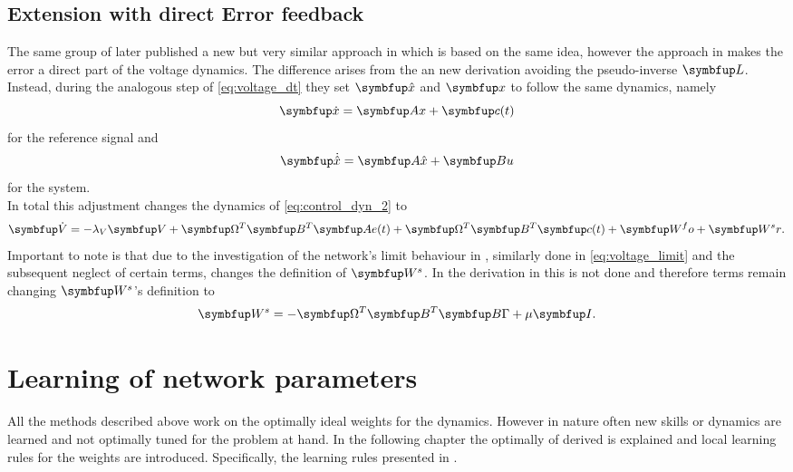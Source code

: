 \subsection{Extension with direct Error feedback}\label{ssec:extension}
The same group of \cite{huang_optimizing_2017} later published a new but very similar approach in \cite{huang_spiking_2019} which is based on the same idea, however the approach in \cite{huang_spiking_2019} makes the error a direct part of the voltage dynamics. The difference arises from the an new derivation avoiding the pseudo-inverse $\bmu{L}$.\\
Instead, during the analogous step of \cref{eq:voltage_dt} they set $\bmu{\hat{x}}$
and $\bmu{x}$ to follow the same dynamics, namely
\begin{equation}\label{eq:feedback_c2}
	\bmu{\dot{x}} = \bmu{Ax} + \bmu{c}(t)
\end{equation}
for the reference signal and
\begin{equation}
	\bmu{\dot{\hat{x}}} = \bmu{A\hat{x}} + \bmu{Bu}
\end{equation}
for the system.\\
In total this adjustment changes the dynamics of \cref{eq:control_dyn_2} to
\begin{equation}\label{eq:direct_error_voltage}
	\bmu{\dot{V}} = -\lambda_V\bmu{V} + \bmu{\Omega}^T \bmu{B}^T\bmu{Ae}(t) + \bmu{\Omega}^T \bmu{B}^T \bmu{c}(t) + \bmu{W^fo} + \bmu{W^sr}.
\end{equation}
Important to note is that due to the investigation of the network's limit behaviour in \cite{huang_optimizing_2017}, similarly done in \cref{eq:voltage_limit} and the subsequent neglect of certain terms, changes the definition of $\bmu{W^s}$. In the derivation in \cite{huang_spiking_2019} this is not done and therefore terms remain changing $\bmu{W^s}$'s definition to
\begin{equation}
	\bmu{W^s} = -\bmu{\Omega}^T\bmu{B}^T\bmu{B\Gamma} + \mu\bmu{I}.
\end{equation}


\section{Learning of network parameters}\label{sec:learning}
All the methods described above work on the optimally ideal weights for the dynamics. However in nature often new skills or dynamics are learned and not optimally tuned for the problem at hand. In the following chapter the optimally of derived is explained and local learning rules for the weights are introduced. Specifically, the learning rules presented in \cite{bourdoukan_learning_2012,brendel_learning_2020,bourdoukan_enforcing_2015}.


